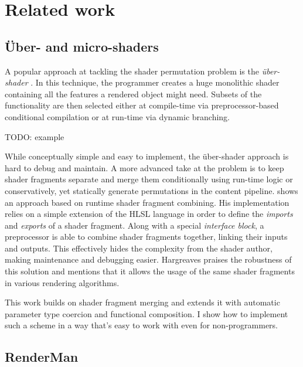 
\chapter{ Related work }
\label{Chapter3}

\section{Über- and micro-shaders}

A popular approach at tackling the shader permutation problem is the \emph{ über-shader }. In this technique, the programmer creates a huge monolithic shader containing all the features a rendered object might need. Subsets of the functionality are then selected either at compile-time via preprocessor-based conditional compilation or at run-time via dynamic branching.

TODO: example

While conceptually simple and easy to implement, the über-shader approach is hard to debug and maintain. A more advanced take at the problem is to keep shader fragments separate and merge them conditionally using run-time logic or conservatively, yet statically generate permutations in the content pipeline. \citet{Hargreaves04} shows an approach based on runtime shader fragment combining. His implementation relies on a simple extension of the HLSL language in order to define the \emph{imports} and \emph{exports} of a shader fragment. Along with a special \emph{interface block}, a preprocessor is able to combine shader fragments together, linking their inputs and outputs. This effectively hides the complexity from the shader author, making maintenance and debugging easier. Hargreaves praises the robustness of this solution and mentions that it allows the usage of the same shader fragments in various rendering algorithms.

This work builds on shader fragment merging and extends it with automatic parameter type coercion and functional composition. I show how to implement such a scheme in a way that's easy to work with even for non-programmers.


\section{RenderMan}

